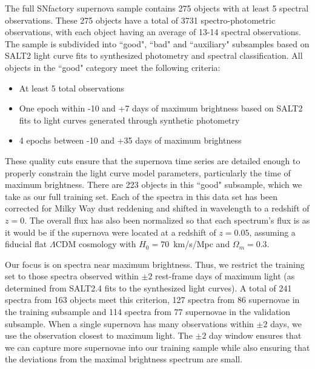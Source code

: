 The full SNfactory supernova sample contains 275 objects with at least 5 spectral observations. These 275 objects have a total of 3731 spectro-photometric observations, with each object having an average of 13-14 spectral observations. The sample is subdivided into ``good", ``bad" and ``auxiliary" subsamples based on SALT2 light curve fits to synthesized photometry and spectral classification. All objects in the ``good" category meet the following criteria:
\begin{itemize}
    \item At least 5 total observations
    \item One epoch within -10 and +7 days of maximum brightness based on SALT2 fits to light curves generated through synthetic photometry
    \item 4 epochs between -10 and +35 days of maximum brightness 
\end{itemize}
These quality cuts ensure that the supernova time series are detailed enough to properly constrain the light curve model parameters, particularly the time of maximum brightness. There are 223 objects in this ``good" subsample, which we take as our full training set. Each of the spectra in this data set has been corrected for Milky Way dust reddening and shifted in wavelength to a redshift of $z=0$. The overall flux has also been normalized so that each spectrum's flux is as it would be if the supernova were located at a redshift of $z=0.05$, assuming a fiducial flat $\Lambda$CDM cosmology with $H_0=70$~km/s/Mpc and $\Omega_m = 0.3$.

Our focus is on spectra near maximum brightness. Thus, we restrict the training set to those spectra observed within $\pm 2$ rest-frame days of maximum light (as determined from SALT2.4 fits to the synthesized light curves). A total of 241 spectra from 163 objects meet this criterion, 127 spectra from 86 supernovae in the training subsample and 114 spectra from 77 supernovae in the validation subsample. When a single supernova has many observations within $\pm 2$ days, we use the observation closest to maximum light. The $\pm 2$ day window ensures that we can capture more supernovae into our training sample while also ensuring that the deviations from the maximal brightness spectrum are small.

